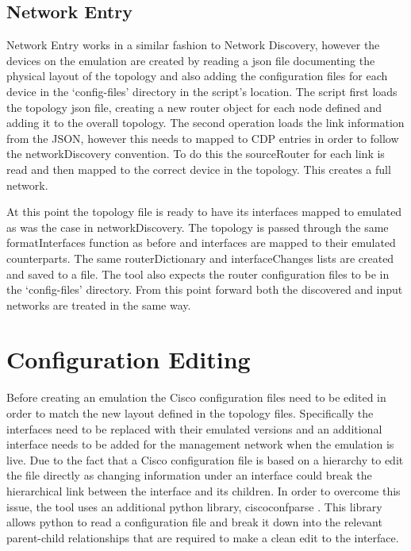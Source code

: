 \documentclass[11pt]{report}
\begin{document}
\subsection{Network Entry}

Network Entry works in a similar fashion to Network Discovery, however the devices on the emulation are created by reading a json file documenting the physical layout of the topology and also adding the configuration files for each device in the `config-files' directory in the script's location. The script first loads the topology json file, creating a new router object for each node defined and adding it to the overall topology. The second operation loads the link information from the JSON, however this needs to mapped to CDP entries in order to follow the networkDiscovery convention. To do this the sourceRouter for each link is read and then mapped to the correct device in the topology. This creates a full network.

At this point the topology file is ready to have its interfaces mapped to emulated  as was the case in networkDiscovery. The topology is passed through the same formatInterfaces function as before and interfaces are mapped to their emulated counterparts. The same routerDictionary and interfaceChanges lists are created and saved to a file. The tool also expects the router configuration files to be in the `config-files' directory. From this point forward both the discovered and input networks are treated in the same way. 

\section{Configuration Editing}

Before creating an emulation the Cisco configuration files need to be edited in order to match the new layout defined in the topology files. Specifically the interfaces need to be replaced with their emulated versions and an additional interface needs to be added for the management network when the emulation is live. Due to the fact that a Cisco configuration file is based on a hierarchy to edit the file directly as changing information under an interface could break the hierarchical link between the interface and its children. In order to overcome this issue, the tool uses an additional python library, ciscoconfparse \citep{ciscoconfparse}. This library allows python to read a configuration file and break it down into the relevant parent-child relationships that are required to make a clean edit to the interface.
\end{document}
